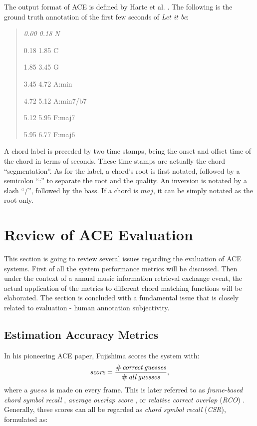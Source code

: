 The output format of ACE is defined by Harte et al. \cite{harte2005symbolic}. The following is the ground truth annotation of the first few seconds of {\it Let it be}:
\begin{quote}\footnotesize \it
0.00 0.18 N

0.18 1.85 C

1.85 3.45 G

3.45 4.72 A:min

4.72 5.12 A:min7/b7

5.12 5.95 F:maj7

5.95 6.77 F:maj6
\end{quote}
A chord label is preceded by two time stamps, being the onset and offset time of the chord in terms of seconds. These time stamps are actually the chord ``segmentation''. As for the label, a chord's root is first notated, followed by a semicolon ``:'' to separate the root and the quality. An inversion is notated by a slash ``/'', followed by the bass. If a chord is $maj$, it can be simply notated as the root only.

\section{Review of ACE Evaluation} \label{sec:2-eval}
This section is going to review several issues regarding the evaluation of ACE systems. First of all the system performance metrics will be discussed. Then under the context of a annual music information retrieval exchange event, the actual application of the metrics to different chord matching functions will be elaborated. The section is concluded with a fundamental issue that is closely related to evaluation - human annotation subjectivity.

\subsection{Estimation Accuracy Metrics} \label{subsec:2-metrics}
In his pioneering ACE paper, Fujishima \cite{fujishima1999realtime} scores the system with:
\begin{equation}\label{eq:2-fujiscore}
\mathit{score = {\#\,correct\,guesses\over\#\,all\,guesses},}
\end{equation}
where a $guess$ is made on every frame. This is later referred to as {\it frame-based chord symbol recall} \cite{harte2010towards}, {\it average overlap score} \cite{oudre2010template}, or {\it relative correct overlap} (\textit{RCO}) \cite{mauch2010automatic}. Generally, these scores can all be regarded as {\it chord symbol recall} (\textit{CSR}), formulated as:

